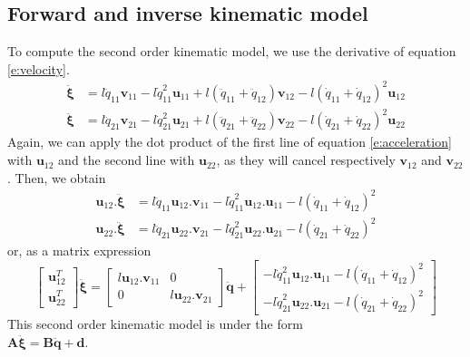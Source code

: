 \documentclass[a4paper]{article}
\begin{document}
\subsection{Forward and inverse kinematic model}
%
To compute the second order kinematic model, we use the derivative of equation \eqref{e:velocity}.
%
\begin{equation}
    \begin{aligned}
    \ddot{\boldsymbol{\xi}} &= l\ddot{q}_{11}\mathbf{v}_{11} -l\dot{q}_{11}^{2}\mathbf{u}_{11} + l(\ddot{q}_{11}+\ddot{q}_{12})\mathbf{v}_{12} - l(\dot{q}_{11}+\dot{q}_{12})^{2}\mathbf{u}_{12}\\
    \ddot{\boldsymbol{\xi}} &= l\ddot{q}_{21}\mathbf{v}_{21} - l\dot{q}_{21}^{2}\mathbf{u}_{21} + l(\ddot{q}_{21}+\ddot{q}_{22})\mathbf{v}_{22} - l(\dot{q}_{21}+\dot{q}_{22})^{2}\mathbf{u}_{22}
    \end{aligned}
    \label{e:acceleration}
\end{equation}
Again, we can apply the dot product of the first line of equation \eqref{e:acceleration} with $\mathbf{u}_{12}$ and the second line with $\mathbf{u}_{22}$, as they will cancel respectively $\mathbf{v}_{12}$ and $\mathbf{v}_{22}$. Then, we obtain
\begin{equation}
    \begin{aligned}
        \mathbf{u}_{12}.\ddot{\boldsymbol{\xi}} &= l\ddot{q}_{11}\mathbf{u}_{12}.\mathbf{v}_{11} -l\dot{q}_{11}^{2}\mathbf{u}_{12}.\mathbf{u}_{11} - l(\dot{q}_{11}+\dot{q}_{12})^{2}\\
        \mathbf{u}_{22}.\ddot{\boldsymbol{\xi}} &= l\ddot{q}_{21}\mathbf{u}_{22}.\mathbf{v}_{21} - l\dot{q}_{21}^{2}\mathbf{u}_{22}.\mathbf{u}_{21} - l(\dot{q}_{21}+\dot{q}_{22})^{2}
    \end{aligned}
\end{equation}
or, as a matrix expression
\begin{equation}
    \begin{bmatrix}
        \mathbf{u}_{12}^T\\
        \mathbf{u}_{22}^T
    \end{bmatrix}
    \ddot{\boldsymbol{\xi}} = 
    \begin{bmatrix}
        l\mathbf{u}_{12}.\mathbf{v}_{11} & 0\\
        0 & l\mathbf{u}_{22}.\mathbf{v}_{21}
    \end{bmatrix}
    \ddot{\mathbf{q}}+
    \begin{bmatrix}
        -l\dot{q}_{11}^{2}\mathbf{u}_{12}.\mathbf{u}_{11} - l(\dot{q}_{11}+\dot{q}_{12})^{2}\\
        -l\dot{q}_{21}^{2}\mathbf{u}_{22}.\mathbf{u}_{21} - l(\dot{q}_{21}+\dot{q}_{22})^{2}
    \end{bmatrix}
    \label{e:KM2}
\end{equation}
This second order kinematic model is under the form\\ ${\mathbf{A}\ddot{\boldsymbol{\xi}}=\mathbf{B}\ddot{\mathbf{q}}+\mathbf{d}}$. 
%
\end{document}
